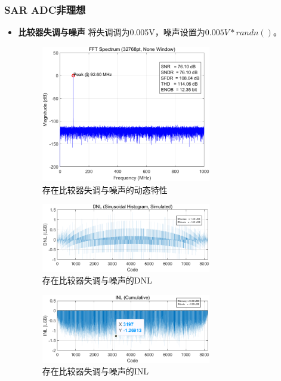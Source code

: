 \documentclass[cs4size,a4paper]{ctexart}
\numberwithin{equation}{section}
\numberwithin{table}{section}
\numberwithin{figure}{section}
\begin{document}
\subsubsection{SAR ADC非理想}
	\begin{itemize}
		\item \textbf{比较器失调与噪声} 将失调调为0.005V，噪声设置为$0.005V*randn()$。
		\begin{figure}[H]
			\centering
			\includegraphics[width=0.7\textwidth]{pic/Comno/DFT.png}
			\caption{存在比较器失调与噪声的动态特性} 
		\end{figure}

		\begin{figure}[H]
			\centering
			\includegraphics[width=0.7\textwidth]{pic/Comno/DNL.png}
			\caption{存在比较器失调与噪声的DNL} 
		\end{figure}

		\begin{figure}[H]
			\centering
			\includegraphics[width=0.7\textwidth]{pic/Comno/INL.png}
			\caption{存在比较器失调与噪声的INL} 
		\end{figure}
	
	\end{itemize}

% 
\clearpage
% 
%
\end{document}
